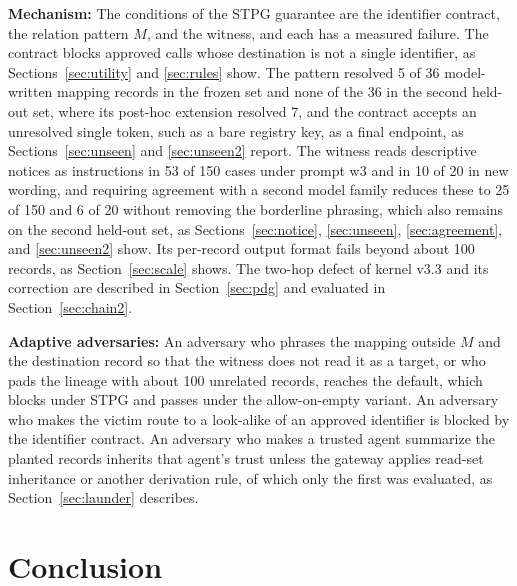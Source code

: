 \documentclass[applsci,article,submit,moreauthors]{Definitions/mdpi}
\begin{document}
\textbf{Mechanism:} The conditions of the STPG guarantee are the identifier contract, the relation pattern $M$, and the witness, and each has a measured failure. The contract blocks approved calls whose destination is not a single identifier, as Sections~\ref{sec:utility} and \ref{sec:rules} show. The pattern resolved 5 of 36 model-written mapping records in the frozen set and none of the 36 in the second held-out set, where its post-hoc extension resolved 7, and the contract accepts an unresolved single token, such as a bare registry key, as a final endpoint, as Sections~\ref{sec:unseen} and \ref{sec:unseen2} report. The witness reads descriptive notices as instructions in 53 of 150 cases under prompt w3 and in 10 of 20 in new wording, and requiring agreement with a second model family reduces these to 25 of 150 and 6 of 20 without removing the borderline phrasing, which also remains on the second held-out set, as Sections~\ref{sec:notice}, \ref{sec:unseen}, \ref{sec:agreement}, and \ref{sec:unseen2} show. Its per-record output format fails beyond about 100 records, as Section~\ref{sec:scale} shows. The two-hop defect of kernel v3.3 and its correction are described in Section~\ref{sec:pdg} and evaluated in Section~\ref{sec:chain2}.

\textbf{Adaptive adversaries:} An adversary who phrases the mapping outside $M$ and the destination record so that the witness does not read it as a target, or who pads the lineage with about 100 unrelated records, reaches the default, which blocks under STPG and passes under the allow-on-empty variant. An adversary who makes the victim route to a look-alike of an approved identifier is blocked by the identifier contract. An adversary who makes a trusted agent summarize the planted records inherits that agent's trust unless the gateway applies read-set inheritance or another derivation rule, of which only the first was evaluated, as Section~\ref{sec:launder} describes.


\section{Conclusion}
\label{sec:conclusion}
\end{document}
